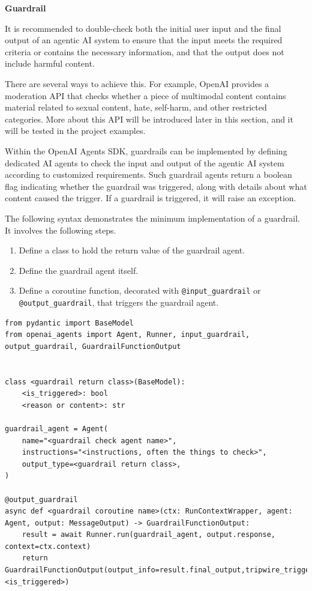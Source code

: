 \vspace{0.1in}
\noindent \textbf{Guardrail}
\vspace{0.1in}

It is recommended to double-check both the initial user input and the final output of an agentic AI system to ensure that the input meets the required criteria or contains the necessary information, and that the output does not include harmful content.

There are several ways to achieve this. For example, OpenAI provides a moderation API that checks whether a piece of multimodal content contains material related to sexual content, hate, self-harm, and other restricted categories. More about this API will be introduced later in this section, and it will be tested in the project examples.

Within the OpenAI Agents SDK, guardrails can be implemented by defining dedicated AI agents to check the input and output of the agentic AI system according to customized requirements. Such guardrail agents return a boolean flag indicating whether the guardrail was triggered, along with details about what content caused the trigger. If a guardrail is triggered, it will raise an exception.

The following syntax demonstrates the minimum implementation of a guardrail. It involves the following steps.
\begin{enumerate}
	\item Define a class to hold the return value of the guardrail agent. 
	\item Define the guardrail agent itself.  
	\item Define a coroutine function, decorated with \verb|@input_guardrail| or \verb|@output_guardrail|, that triggers the guardrail agent.
\end{enumerate}

\begin{lstlisting}
from pydantic import BaseModel
from openai_agents import Agent, Runner, input_guardrail, output_guardrail, GuardrailFunctionOutput


class <guardrail return class>(BaseModel):
	<is_triggered>: bool
	<reason or content>: str

guardrail_agent = Agent(
	name="<guardrail check agent name>",
	instructions="<instructions, often the things to check>",
	output_type=<guardrail return class>,
)

@output_guardrail
async def <guardrail coroutine name>(ctx: RunContextWrapper, agent: Agent, output: MessageOutput) -> GuardrailFunctionOutput:
	result = await Runner.run(guardrail_agent, output.response, context=ctx.context)
	return GuardrailFunctionOutput(output_info=result.final_output,tripwire_triggered=result.final_output.<is_triggered>)
\end{lstlisting}

